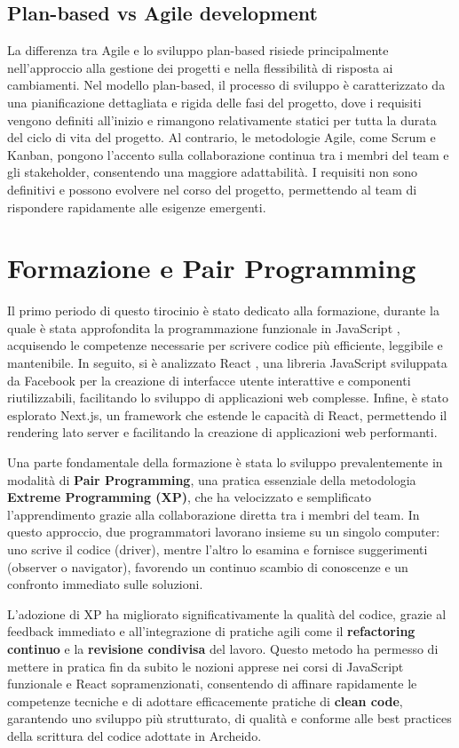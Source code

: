 \documentclass[target=bach,aauheader=,style=]{thud}
\begin{document}
\subsection{Plan-based vs Agile development}
La differenza tra Agile e lo sviluppo plan-based risiede principalmente nell'approccio alla gestione dei progetti e nella flessibilità di risposta ai cambiamenti. Nel modello plan-based, il processo di sviluppo è caratterizzato da una pianificazione dettagliata e rigida delle fasi del progetto, dove i requisiti vengono definiti all'inizio e rimangono relativamente statici per tutta la durata del ciclo di vita del progetto. Al contrario, le metodologie Agile, come Scrum e Kanban, pongono l'accento sulla collaborazione continua tra i membri del team e gli stakeholder, consentendo una maggiore adattabilità. I requisiti non sono definitivi e possono evolvere nel corso del progetto, permettendo al team di rispondere rapidamente alle esigenze emergenti.


\section{Formazione e Pair Programming}
Il primo periodo di questo tirocinio è stato dedicato alla formazione, durante la quale è stata approfondita la programmazione funzionale in JavaScript \cite{knowthen2024}, acquisendo le competenze necessarie per scrivere codice più efficiente, leggibile e mantenibile. In seguito, si è analizzato React \cite{udemyreactredux2024}, una libreria JavaScript sviluppata da Facebook per la creazione di interfacce utente interattive e componenti riutilizzabili, facilitando lo sviluppo di applicazioni web complesse. Infine, è stato esplorato Next.js, un framework che estende le capacità di React, permettendo il rendering lato server e facilitando la creazione di applicazioni web performanti.

\noindent Una parte fondamentale della formazione è stata lo sviluppo prevalentemente in modalità di \textbf{Pair Programming}, una pratica essenziale della metodologia \textbf{Extreme Programming (XP)}, che ha velocizzato e semplificato l'apprendimento grazie alla collaborazione diretta tra i membri del team. In questo approccio, due programmatori lavorano insieme su un singolo computer: uno scrive il codice (driver), mentre l'altro lo esamina e fornisce suggerimenti (observer o navigator), favorendo un continuo scambio di conoscenze e un confronto immediato sulle soluzioni.

\noindent L'adozione di XP ha migliorato significativamente la qualità del codice, grazie al feedback immediato e all'integrazione di pratiche agili come il \textbf{refactoring continuo} e la \textbf{revisione condivisa} del lavoro. Questo metodo ha permesso di mettere in pratica fin da subito le nozioni apprese nei corsi di JavaScript funzionale e React sopramenzionati, consentendo di affinare rapidamente le competenze tecniche e di adottare efficacemente pratiche di \textbf{clean code}, garantendo uno sviluppo più strutturato, di qualità e conforme alle best practices della scrittura del codice adottate in Archeido.
\end{document}
